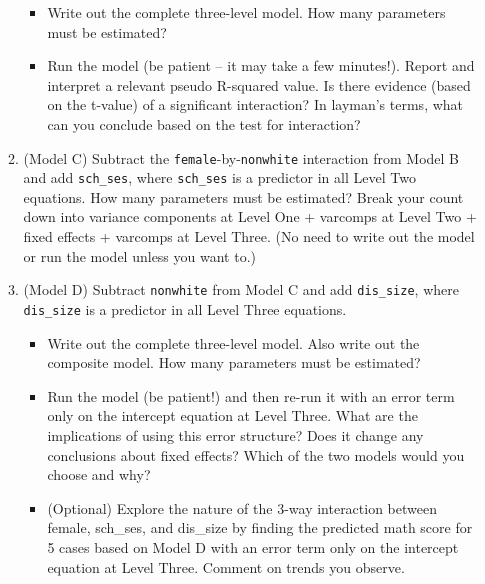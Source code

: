 \documentclass[
]{krantz}
\providecommand{\tightlist}{%
  \setlength{\itemsep}{0pt}\setlength{\parskip}{0pt}}
\begin{document}
\begin{enumerate}
\begin{enumerate}
    \begin{itemize}
    \tightlist
    \item
      Write out the complete three-level model. How many parameters must be estimated?
    \item
      Run the model (be patient -- it may take a few minutes!). Report and interpret a relevant pseudo R-squared value. Is there evidence (based on the t-value) of a significant interaction? In layman's terms, what can you conclude based on the test for interaction?
    \end{itemize}
  \item
    (Model C) Subtract the \texttt{female}-by-\texttt{nonwhite} interaction from Model B and add \texttt{sch\_ses}, where \texttt{sch\_ses} is a predictor in all Level Two equations. How many parameters must be estimated? Break your count down into variance components at Level One + varcomps at Level Two + fixed effects + varcomps at Level Three. (No need to write out the model or run the model unless you want to.)
  \item
    (Model D) Subtract \texttt{nonwhite} from Model C and add \texttt{dis\_size}, where \texttt{dis\_size} is a predictor in all Level Three equations.

    \begin{itemize}
    \tightlist
    \item
      Write out the complete three-level model. Also write out the composite model. How many parameters must be estimated?
    \item
      Run the model (be patient!) and then re-run it with an error term only on the intercept equation at Level Three. What are the implications of using this error structure? Does it change any conclusions about fixed effects? Which of the two models would you choose and why?
    \item
      (Optional) Explore the nature of the 3-way interaction between female, sch\_ses, and dis\_size by finding the predicted math score for 5 cases based on Model D with an error term only on the intercept equation at Level Three. Comment on trends you observe.


\end{itemize}
\end{enumerate}
\end{enumerate}
\end{document}
